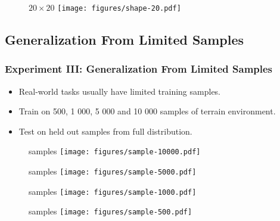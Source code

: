 \begin{frame}
    \begin{figure}
        \centering
        \(20 \times 20\)
        \texttt{[image: figures/shape-20.pdf]}
    \end{figure}
\end{frame}

\subsection{Generalization From Limited Samples}

\begin{frame}
    \frametitle{Experiment III: Generalization From Limited Samples}

    \begin{itemize}
        \item Real-world tasks usually have limited training samples.
        \item Train on 500, 1 000, 5 000 and 10 000 samples of terrain environment.
        \item Test on held out samples from full distribution.
    \end{itemize}
\end{frame}

\begin{frame}
    \begin{figure}
         samples
        \texttt{[image: figures/sample-10000.pdf]}
    \end{figure}
\end{frame}

\begin{frame}
    \begin{figure}
         samples
        \texttt{[image: figures/sample-5000.pdf]}
    \end{figure}
\end{frame}

\begin{frame}
    \begin{figure}
         samples
        \texttt{[image: figures/sample-1000.pdf]}
    \end{figure}
\end{frame}

\begin{frame}
    \begin{figure}
         samples
        \texttt{[image: figures/sample-500.pdf]}
    \end{figure}
\end{frame}